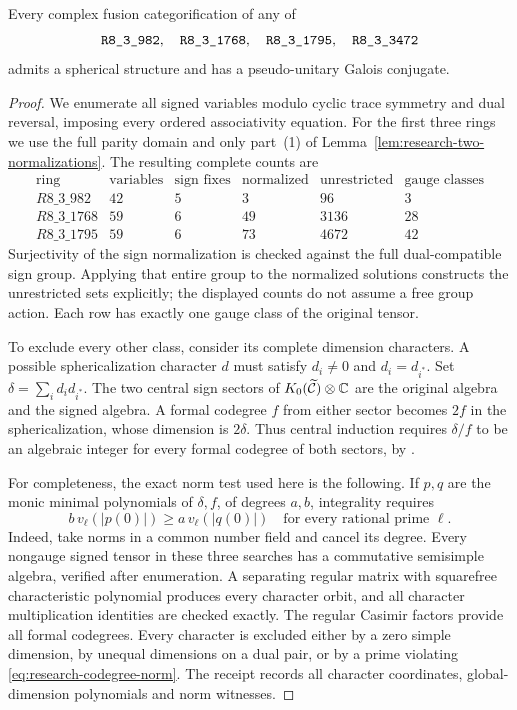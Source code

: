 \begin{theorem}
\label{thm:research-four-general-spherical}
Every complex fusion categorification of any of
\[
 \sha{R8_3_982},\quad \sha{R8_3_1768},\quad
 \sha{R8_3_1795},\quad \sha{R8_3_3472}
\]
admits a spherical structure and has a pseudo-unitary Galois conjugate.
\end{theorem}
\begin{proof}
We enumerate all signed variables modulo cyclic trace symmetry and
dual reversal, imposing every ordered associativity equation.
For the first three rings we use the full parity domain and only
part~(1) of Lemma~\ref{lem:research-two-normalizations}.  The resulting
complete counts are
\[
\begin{array}{c|r|r|r|r|r}
\text{ring}&\text{variables}&\text{sign fixes}&\text{normalized}
 &\text{unrestricted}&\text{gauge classes}\\\hline
R8\_3\_982&42&5&3&96&3\\
R8\_3\_1768&59&6&49&3136&28\\
R8\_3\_1795&59&6&73&4672&42
\end{array}
\]
Surjectivity of the sign normalization is checked against the full
dual-compatible sign group.  Applying that entire group to the
normalized solutions constructs the unrestricted sets explicitly;
the displayed counts do not assume a free group action.
Each row has exactly one gauge class of the original tensor.

To exclude every other class, consider its complete dimension
characters.  A possible sphericalization character $d$ must satisfy
$d_i\ne0$ and $d_i=d_{i^*}$.  Set
$\delta=\sum_i d_i d_{i^*}$.  The two central sign sectors of
$K_0(\widetilde{\mathcal C})\otimes\mathbb C$ are the original algebra and
the signed algebra.  A formal codegree $f$ from either sector becomes
$2f$ in the sphericalization, whose dimension is $2\delta$.
Thus central induction requires $\delta/f$ to be an algebraic integer
for every formal codegree of both sectors, by
\cite[Theorem~2.13 and Corollary~2.14]{OstrikPiv3}.

For completeness, the exact norm test used here is the following.
If $p,q$ are the monic minimal polynomials of $\delta,f$, of degrees
$a,b$, integrality requires
\begin{equation}\label{eq:research-codegree-norm}
 b\,v_\ell(|p(0)|)\geq a\,v_\ell(|q(0)|)
 \quad\text{for every rational prime }\ell.
\end{equation}
Indeed, take norms in a common number field and cancel its degree.
Every nongauge signed tensor in these three searches has a commutative
semisimple algebra, verified after enumeration.  A separating regular
matrix with squarefree characteristic polynomial produces every
character orbit, and all character multiplication identities are
checked exactly.  The regular Casimir factors provide all formal
codegrees.  Every character is excluded either by a zero simple
dimension, by unequal dimensions on a dual pair, or by a prime violating
\eqref{eq:research-codegree-norm}.  The receipt records all character
coordinates, global-dimension polynomials and norm witnesses.


\end{proof}

